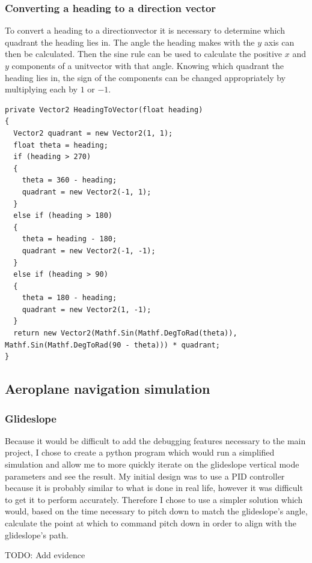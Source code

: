 \documentclass{article}
\begin{document}
\subsubsection{Converting a heading to a direction vector}
To convert a \gls{heading} to a \gls{directionvector} it is necessary to determine which \gls{quadrant} the \gls{heading} lies in.
The angle the \gls{heading} makes with the $y$ axis can then be calculated.
Then the sine rule can be used to calculate the positive $x$ and $y$ components of a \gls{unitvector} with that angle.
Knowing which \gls{quadrant} the \gls{heading} lies in, the sign of the components can be changed appropriately by multiplying each by $1$ or $-1$.
\lstset{style=csharp}
\begin{lstlisting}[caption=Converting a heading to a vector]
private Vector2 HeadingToVector(float heading)
{
  Vector2 quadrant = new Vector2(1, 1);
  float theta = heading;
  if (heading > 270)
  {
    theta = 360 - heading;
    quadrant = new Vector2(-1, 1);
  }
  else if (heading > 180)
  {
    theta = heading - 180;
    quadrant = new Vector2(-1, -1);
  }
  else if (heading > 90)
  {
    theta = 180 - heading;
    quadrant = new Vector2(1, -1);
  }
  return new Vector2(Mathf.Sin(Mathf.DegToRad(theta)), Mathf.Sin(Mathf.DegToRad(90 - theta))) * quadrant;
}
\end{lstlisting}


\subsection{Aeroplane navigation simulation}
\subsubsection{Glideslope}
Because it would be difficult to add the debugging features necessary to the main project, I chose to create a python program which would run a simplified simulation and allow me to more quickly iterate on the glideslope vertical mode parameters and see the result.
My initial design was to use a PID controller\cite{pidcontroller} because it is probably similar to what is done in real life, however it was difficult to get it to perform accurately.
Therefore I chose to use a simpler solution which would, based on the time necessary to pitch down to match the glideslope's angle, calculate the point at which to command pitch down in order to align with the glideslope's path.

TODO: Add evidence
\end{document}
